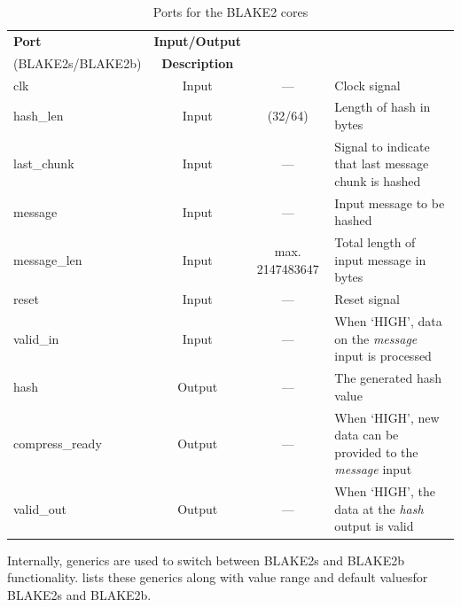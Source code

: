 \documentclass[%
	a4paper,
]
{article}
\begin{document}
\begin{table}[htp]

	\centering
	\caption{Ports for the BLAKE2 cores}	
	\label{tbl:blake2-ports}
	\renewcommand{\arraystretch}{2}
	\begin{tabular}{l|c|c|m{3cm}}


	\hline
	\textbf{Port}
	& \textbf{Input/Output}
	&	\begin{minipage}[c]{3cm}%
				\textbf{Default value} \\
				(BLAKE2s/BLAKE2b)%
			\end{minipage}%
	& \textbf{Description}
	\\\hline

	clk
	& Input
	& ---
	& Clock signal
	\\\hline

	hash_len
	& Input
	& (32/64)
	&	Length of hash in bytes
	\\\hline

	last_chunk
	& Input
	& ---
	&	Signal to indicate that last message chunk is hashed%
	\\\hline

	message
	& Input
	& ---
	&	Input message to be hashed
	\\\hline

	message_len
	& Input
	& max. 2147483647
	& Total length of input message in bytes
	\\\hline

	reset
	& Input
	& ---
	& Reset signal
	\\\hline

	valid_in
	& Input
	& ---
	&	When `HIGH', data on the \emph{message} input is processed
	\\\hline

	hash
	& Output
	& ---
	&	The generated hash value
	\\\hline

	compress_ready
	& Output
	& ---
	&	When `HIGH', new data can be provided to the \emph{message} input
	\\\hline

	valid_out
	& Output
	& ---
	&	When `HIGH', the data at the \emph{hash} output is valid
	\\\hline

	\end{tabular}

\end{table}
%
%
Internally, generics are used to switch between BLAKE2s and BLAKE2b
functionality.  lists these generics along with
value range and default valuesfor BLAKE2s and BLAKE2b.
\end{document}
